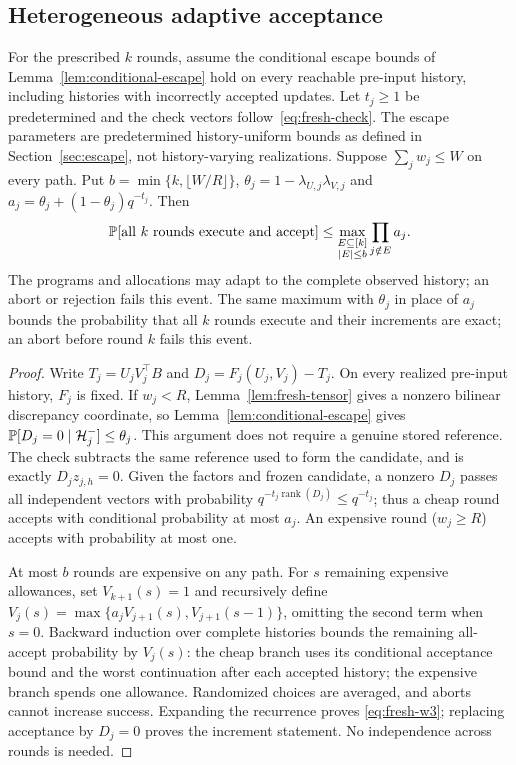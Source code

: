 \subsection{Heterogeneous adaptive acceptance}\label{sec:heterogeneous}
\begin{theorem}\label{thm:fresh-stateful}
For the prescribed $k$ rounds, assume the conditional escape bounds of
Lemma~\ref{lem:conditional-escape} hold on every reachable pre-input history,
including histories with incorrectly accepted updates. Let $t_j\ge1$ be
predetermined and the check vectors follow~\eqref{eq:fresh-check}. The
escape parameters are predetermined history-uniform bounds as defined in
Section~\ref{sec:escape}, not history-varying realizations. Suppose
$\sum_j w_j\le W$ on every path. Put
$b=\min\{k,\lfloor W/R\rfloor\}$,
$\theta_j=1-\lambda_{U,j}\lambda_{V,j}$ and
$a_j=\theta_j+(1-\theta_j)q^{-t_j}$. Then
\begin{equation}\label{eq:fresh-w3}
\mathbb P[\text{all $k$ rounds execute and accept}]
\le\max_{\substack{E\subseteq[k]\\ |E|\le b}}\prod_{j\notin E}a_j.
\end{equation}
The programs and allocations may adapt to the complete observed history;
an abort or rejection fails this event. The same maximum with $\theta_j$
in place of $a_j$ bounds the probability that all $k$ rounds execute and
their increments are exact; an abort before round $k$ fails this event.
\end{theorem}
\begin{proof}
Write $T_j=U_jV_j^\top B$ and $D_j=F_j(U_j,V_j)-T_j$.
On every realized pre-input history, $F_j$ is fixed. If $w_j<R$,
Lemma~\ref{lem:fresh-tensor} gives a nonzero bilinear discrepancy
coordinate, so Lemma~\ref{lem:conditional-escape} gives
$\mathbb P[D_j=0\mid\mathcal H_j^-]\le\theta_j$. This argument does not
require a genuine stored reference. The check subtracts the same reference
used to form the candidate, and is exactly $D_jz_{j,h}=0$. Given the
factors and frozen candidate, a nonzero $D_j$ passes all independent
vectors with probability $q^{-t_j\operatorname{rank}(D_j)}\le q^{-t_j}$;
thus a cheap round accepts with conditional probability at most $a_j$.
An expensive round ($w_j\ge R$) accepts with probability at most one.

At most $b$ rounds are expensive on any path. For $s$ remaining expensive
allowances, set $V_{k+1}(s)=1$ and recursively define
$V_j(s)=\max\{a_jV_{j+1}(s),V_{j+1}(s-1)\}$, omitting the second term
when $s=0$. Backward induction over complete histories bounds the remaining
all-accept probability by $V_j(s)$: the cheap branch uses its conditional
acceptance bound and the worst continuation after each accepted history;
the expensive branch spends one allowance. Randomized choices are averaged,
and aborts cannot increase success. Expanding the recurrence proves
\eqref{eq:fresh-w3}; replacing acceptance by $D_j=0$ proves the increment
statement. No independence across rounds is needed.
\end{proof}

